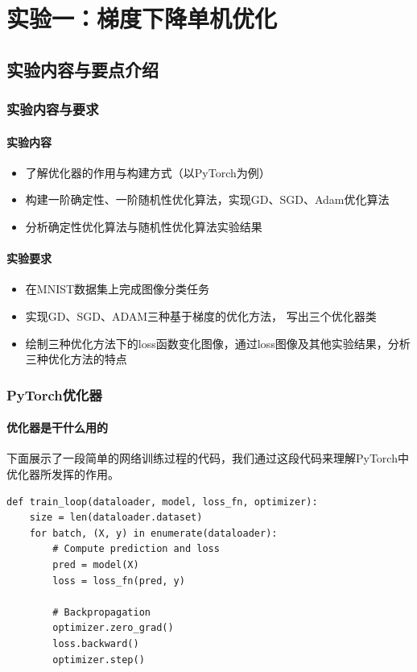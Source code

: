 \chapter{实验一：梯度下降单机优化}

\section{实验内容与要点介绍}

\subsection{实验内容与要求}

\subsubsection{实验内容}
\begin{itemize}
    \item 了解优化器的作用与构建方式（以PyTorch为例）
    \item 构建一阶确定性、一阶随机性优化算法，实现GD、SGD、Adam优化算法
    \item 分析确定性优化算法与随机性优化算法实验结果
\end{itemize}

\subsubsection{实验要求}
\begin{itemize}
    \item 在MNIST数据集上完成图像分类任务
    \item 实现GD、SGD、ADAM三种基于梯度的优化方法， 写出三个优化器类
    \item 绘制三种优化方法下的loss函数变化图像，通过loss图像及其他实验结果，分析三种优化方法的特点
\end{itemize}

\subsection{PyTorch优化器}

\subsubsection{优化器是干什么用的}

下面展示了一段简单的网络训练过程的代码，我们通过这段代码来理解PyTorch中优化器所发挥的作用。

\begin{lstlisting}
def train_loop(dataloader, model, loss_fn, optimizer):
    size = len(dataloader.dataset)
    for batch, (X, y) in enumerate(dataloader):
        # Compute prediction and loss
        pred = model(X)
        loss = loss_fn(pred, y)
        
        # Backpropagation
        optimizer.zero_grad()
        loss.backward()
        optimizer.step()
\end{lstlisting}
    
